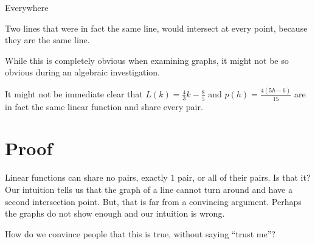\documentclass{ximera}
\begin{document}
\begin{example} Everywhere 

Two lines that were in fact the same line, would intersect at every point, because they are the same line.
\begin{image}
\end{image}


While this is completely obvious when examining graphs, it might not be so obvious during an algebraic investigation.

It might not be immediate clear that $L(k) = \frac{4}{3}k - \frac{8}{5}$ and $p(h) = \frac{4(5h-6)}{15}$ are in fact the same linear function and share every pair.

\end{example}










\section{Proof}



Linear functions can share no pairs, exactly $1$ pair, or all of their pairs.  Is that it?  Our intuition tells us that the graph of a line cannot turn around and have a second intersection point.  But, that is far from a convincing argument.  Perhaps the graphs do not show enough and our intuition is wrong.  

How do we convince people that this is true, without saying ``trust me''?
\end{document}
